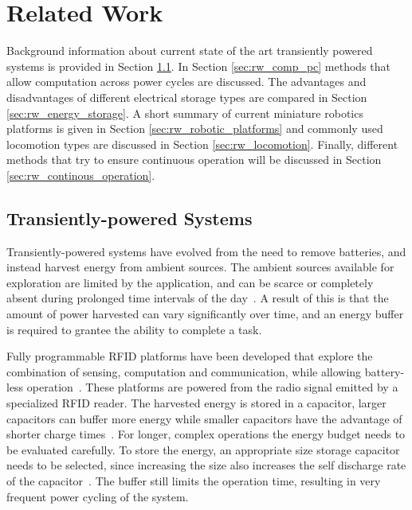 \chapter{Related Work}
\label{chp:related_work}

Background information about current state of the art transiently powered systems is provided in Section \ref{sec:rw_tp_systems}.
In Section \ref{sec:rw_comp_pc} methods that allow computation across power cycles are discussed.
The advantages and disadvantages of different electrical storage types are compared in Section \ref{sec:rw_energy_storage}. 
A short summary of current miniature robotics platforms is given in Section \ref{sec:rw_robotic_platforms} and commonly used locomotion types are discussed in Section \ref{sec:rw_locomotion}. 
Finally, different methods that try to ensure continuous operation will be discussed in Section \ref{sec:rw_continous_operation}.

\section{Transiently-powered Systems}
\label{sec:rw_tp_systems}

Transiently-powered systems have evolved from the need to remove batteries, and instead harvest energy from ambient sources.
The ambient sources available for exploration are limited by the application, and can be scarce or completely absent during prolonged time intervals of the day~\cite{konstantopoulos_im_2016}.
A result of this is that the amount of power harvested can vary significantly over time, and an energy buffer is required to grantee the ability to complete a task.

Fully programmable RFID platforms have been developed that explore the combination of sensing, computation and communication, while allowing battery-less operation~\cite{sample_transim_2008}.
These platforms are powered from the radio signal emitted by a specialized RFID reader. 
The harvested energy is stored in a capacitor, larger capacitors can buffer more energy while smaller capacitors have the advantage of shorter charge times~\cite{gummerson_mobisys_2010}.
For longer, complex operations the energy budget needs to be evaluated carefully.
To store the energy, an appropriate size storage capacitor needs to be selected, since increasing the size also increases the self discharge rate of the capacitor~\cite{naderiparizi_rfid_2015}.
The buffer still limits the operation time, resulting in very frequent power cycling of the system.

